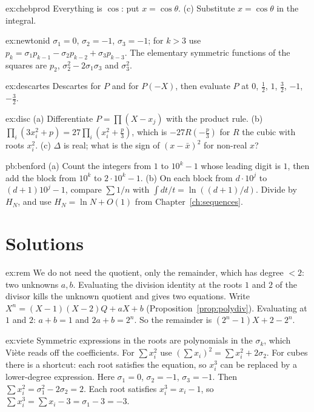 \begin{hint}{ex:chebprod}
Everything is $\cos$: put $x=\cos\theta$. (c) Substitute $x=\cos\theta$ in the integral.
\end{hint}
\begin{hint}{ex:newtonid}
$\sigma_1=0$, $\sigma_2=-1$, $\sigma_3=-1$; for $k>3$ use $p_k=\sigma_1p_{k-1}-\sigma_2p_{k-2}+\sigma_3p_{k-3}$. The elementary symmetric functions of the squares are $p_2$, $\sigma_2^2-2\sigma_1\sigma_3$ and $\sigma_3^2$.
\end{hint}
\begin{hint}{ex:descartes}
Descartes for $P$ and for $P(-X)$, then evaluate $P$ at $0$, $\frac12$, $1$, $\frac32$, $-1$, $-\frac32$.
\end{hint}
\begin{hint}{ex:disc}
(a) Differentiate $P=\prod(X-x_j)$ with the product rule. (b) $\prod_i(3x_i^2+p)=27\prod_i(x_i^2+\frac p3)$, which is $-27R(-\frac p3)$ for $R$ the cubic with roots $x_i^2$. (c) $\Delta$ is real; what is the sign of $(x-\bar x)^2$ for non-real $x$?
\end{hint}
\begin{hint}{pb:benford}
(a) Count the integers from $1$ to $10^k-1$ whose leading digit is $1$, then add the block from $10^k$ to $2\cdot 10^k-1$. (b) On each block from $d\cdot 10^j$ to $(d+1)10^j-1$, compare $\sum 1/n$ with $\int dt/t=\ln((d+1)/d)$. Divide by $H_N$, and use $H_N=\ln N+O(1)$ from Chapter~\ref{ch:sequences}.
\end{hint}

\section{Solutions}

\begin{solution}{ex:rem}
\idea We do not need the quotient, only the remainder, which has degree $<2$: two unknowns $a,b$. Evaluating the division identity at the roots $1$ and $2$ of the divisor kills the unknown quotient and gives two equations.
\writeup Write $X^n=(X-1)(X-2)Q+aX+b$ (Proposition~\ref{prop:polydiv}). Evaluating at $1$ and $2$: $a+b=1$ and $2a+b=2^n$. So the remainder is $(2^n-1)X+2-2^n$.
\end{solution}

\begin{solution}{ex:viete}
\idea Symmetric expressions in the roots are polynomials in the $\sigma_k$, which Vi\`ete reads off the coefficients. For $\sum x_i^2$ use $(\sum x_i)^2=\sum x_i^2+2\sigma_2$. For cubes there is a shortcut: each root satisfies the equation, so $x_i^3$ can be replaced by a lower-degree expression.
\writeup Here $\sigma_1=0$, $\sigma_2=-1$, $\sigma_3=-1$. Then $\sum x_i^2=\sigma_1^2-2\sigma_2=2$. Each root satisfies $x_i^3=x_i-1$, so
$\sum x_i^3=\sum x_i-3=\sigma_1-3=-3$.
\end{solution}

